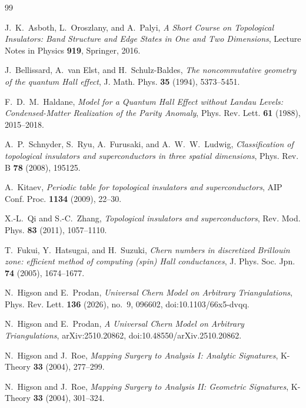 \documentclass[11pt]{article}
\numberwithin{equation}{section}
\theoremstyle{definition}
\theoremstyle{remark}
\begin{document}
\begin{thebibliography}{99}

J.~K.~Asboth, L.~Oroszlany, and A.~Palyi,
\emph{A Short Course on Topological Insulators: Band Structure and Edge States in One and Two
Dimensions},
Lecture Notes in Physics \textbf{919}, Springer, 2016.

J.~Bellissard, A.~van Elst, and H.~Schulz-Baldes,
\emph{The noncommutative geometry of the quantum Hall effect},
J. Math. Phys. \textbf{35} (1994), 5373--5451.

F.~D.~M.~Haldane,
\emph{Model for a Quantum Hall Effect without Landau Levels: Condensed-Matter Realization of the Parity Anomaly},
Phys. Rev. Lett. \textbf{61} (1988), 2015--2018.

A.~P.~Schnyder, S.~Ryu, A.~Furusaki, and A.~W.~W.~Ludwig,
\emph{Classification of topological insulators and superconductors in three spatial dimensions},
Phys. Rev. B \textbf{78} (2008), 195125.

A.~Kitaev,
\emph{Periodic table for topological insulators and superconductors},
AIP Conf. Proc. \textbf{1134} (2009), 22--30.

X.-L.~Qi and S.-C.~Zhang,
\emph{Topological insulators and superconductors},
Rev. Mod. Phys. \textbf{83} (2011), 1057--1110.

T.~Fukui, Y.~Hatsugai, and H.~Suzuki,
\emph{Chern numbers in discretized Brillouin zone: efficient method of computing (spin) Hall conductances},
J. Phys. Soc. Jpn. \textbf{74} (2005), 1674--1677.

N.~Higson and E.~Prodan,
\emph{Universal Chern Model on Arbitrary Triangulations},
Phys. Rev. Lett. \textbf{136} (2026), no.~9, 096602,
doi:10.1103/66x5-dvqq.

N.~Higson and E.~Prodan,
\emph{A Universal Chern Model on Arbitrary Triangulations},
arXiv:2510.20862, doi:10.48550/arXiv.2510.20862.

N.~Higson and J.~Roe,
\emph{Mapping Surgery to Analysis I: Analytic Signatures},
K-Theory \textbf{33} (2004), 277--299.

N.~Higson and J.~Roe,
\emph{Mapping Surgery to Analysis II: Geometric Signatures},
K-Theory \textbf{33} (2004), 301--324.


\end{thebibliography}
\end{document}
